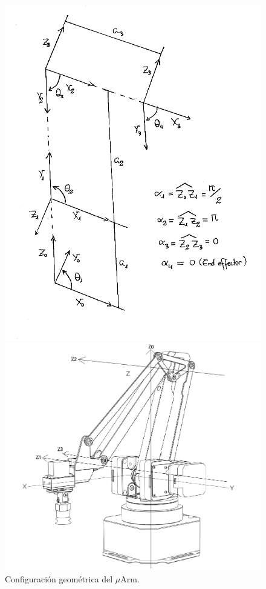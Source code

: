 \begin{figure}[H]
    \centering
    \begin{minipage}{.4\linewidth}
        \centering
        \includegraphics[width=\textwidth]{pictures/geometric_configuration_2.png}
        \caption{Configuración geométrica del $\mu$Arm.}
        \label{fig:uArm_gc}
    \end{minipage}
    \hfill
    \begin{minipage}{.48\linewidth}
        \centering
        \includegraphics[width=\textwidth]{pictures/axis.png}

\end{minipage}
\end{figure}
